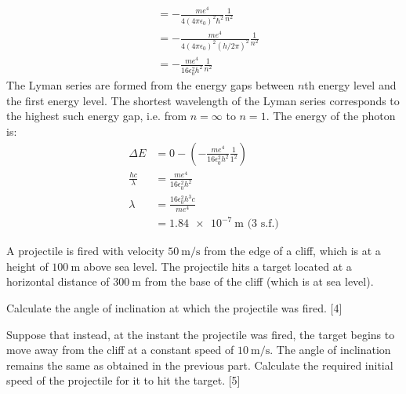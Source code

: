 \begin{solution}
\begin{subsolution}
\begin{align*}
            &=-\frac{me^4}{4(4\pi\epsilon_0)^2\hbar^2}\frac{1}{n^2}\\
            &=-\frac{me^4}{4(4\pi\epsilon_0)^2(h/2\pi)^2}\frac{1}{n^2}\\
            &=-\frac{me^4}{16\epsilon_0^2h^2}\frac{1}{n^2}
        \end{align*}
        The Lyman series are formed from the energy gaps between $n$th energy level and the first energy level. The shortest wavelength of the Lyman series corresponds to the highest such energy gap, i.e. from $n=\infty$ to $n=1$. The energy of the photon is:
        \begin{align*}
            \Delta E&=0-\left(-\frac{me^4}{16\epsilon_0^2h^2}\frac{1}{1^2}\right)\\
            \frac{hc}{\lambda}&=\frac{me^4}{16\epsilon_0^2h^2}\\
            \lambda&=\frac{16\epsilon_0^2h^3c}{me^4}\\
            &=\boxed{\qty{1.84e-7}{\m}}\text{ (3 s.f.)}
        \end{align*}
    \end{subsolution}
\end{solution}

\begin{problem}
    A projectile is fired with velocity $\qty{50}{\m\per\s}$ from the edge of a cliff, which is at a height of $\qty{100}{\m}$ above sea level. The projectile hits a target located at a horizontal distance of $\qty{300}{\m}$ from the base of the cliff (which is at sea level).
    \begin{subproblem}
        Calculate the angle of inclination at which the projectile was fired.
    \hfill{[4]}\end{subproblem}
    \begin{subproblem}
        Suppose that instead, at the instant the projectile was fired, the target begins to move away from the cliff at a constant speed of $\qty{10}{\m\per\s}$. The angle of inclination remains the same as obtained in the previous part. Calculate the required initial speed of the projectile for it to hit the target.
    \hfill{[5]}\end{subproblem}
\end{problem}

